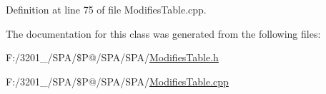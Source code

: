 Definition at line 75 of file Modifies\-Table.\-cpp.



The documentation for this class was generated from the following files\-:\begin{DoxyCompactItemize}
\item 
F\-:/3201\-\_/\-S\-P\-A/\$\-P@/\-S\-P\-A/\-S\-P\-A/\hyperlink{_modifies_table_8h}{Modifies\-Table.\-h}\item 
F\-:/3201\-\_/\-S\-P\-A/\$\-P@/\-S\-P\-A/\-S\-P\-A/\hyperlink{_modifies_table_8cpp}{Modifies\-Table.\-cpp}\end{DoxyCompactItemize}
